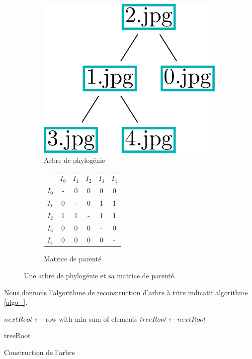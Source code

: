 \documentclass[utf8,final]{stageM2R} %
\begin{document}
\begin{figure}
  \begin{subfigure}{.5\textwidth}
    \centering
    \includegraphics[width=.5\linewidth]{images/algo_tree.png}
    \caption{Arbre de phylogénie}
    \label{algo_tree}
  \end{subfigure}%
  \begin{subfigure}{.5\textwidth}
    \centering
    \begin{tabular}{|r||c|c|c|c|c|}
      \hline
      - & $I_{0}$ & $I_{1}$ & $I_{2}$ & $I_{3}$ & $I_{4}$ \\ \hhline{|=::=|=|=|=|=|}
      $I_{0}$ & - & 0 & 0 & 0 & 0 \\ \hline
      $I_{1}$ & 0 & - & 0 & 1 & 1 \\ \hline
      $I_{2}$ & 1 & 1 & - & 1 & 1 \\ \hline
      $I_{3}$ & 0 & 0 & 0 & - & 0 \\ \hline
      $I_{4}$ & 0 & 0 & 0 & 0 & - \\ \hline
    \end{tabular} 
    \caption{Matrice de parenté}
    \label{parentage_matrix}
  \end{subfigure}
  \caption{Une arbre de phylogénie et sa matrice de parenté.}
  \label{parentage_tree}
\end{figure}

Nous donnons l'algorithme de reconstruction d'arbre à titre indicatif algorithme \ref{algo_}.

\begin{algorithm}[]
  \LinesNumbered
  \BlankLine
  $nextRoot \leftarrow$ row with min sum of elements\;
  $treeRoot \leftarrow nextRoot$\;
  \BlankLine

  \KwRet treeRoot
\caption{Construction de l'arbre}
\label{algo_}
\end{algorithm}
\vspace{5mm}
\end{document}
